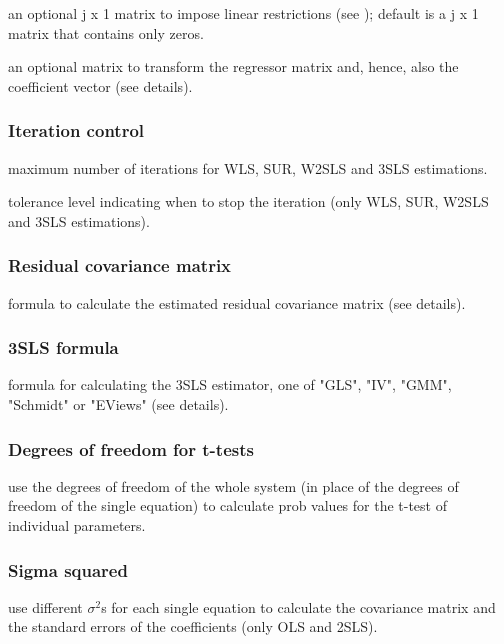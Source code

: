 \documentclass[article]{jss}
\begin{document}
 an optional j x 1 matrix to impose linear
   restrictions (see ); default is a j x 1 matrix
   that contains only zeros.

 an optional matrix to transform the regressor matrix and,
   hence, also the coefficient vector (see details).

\subsubsection{Iteration control}   
 maximum number of iterations for WLS, SUR, W2SLS and
   3SLS estimations.

 tolerance level indicating when to stop the iteration (only
   WLS, SUR, W2SLS and 3SLS estimations).

\subsubsection{Residual covariance matrix}   
 formula to calculate the estimated residual covariance
   matrix (see details).

\subsubsection{3SLS formula}   
 formula for calculating the 3SLS estimator,
   one of "GLS", "IV", "GMM", "Schmidt" or "EViews" (see details).

\subsubsection{Degrees of freedom for t-tests}   
 use the degrees of freedom of the whole system
   (in place of the degrees of freedom of the single equation)
   to calculate prob values for the t-test of individual parameters.

\subsubsection{Sigma squared}   
 use different $\sigma^2$s for each
   single equation to calculate the covariance matrix and the
   standard errors of the coefficients (only OLS and 2SLS).
\end{document}
